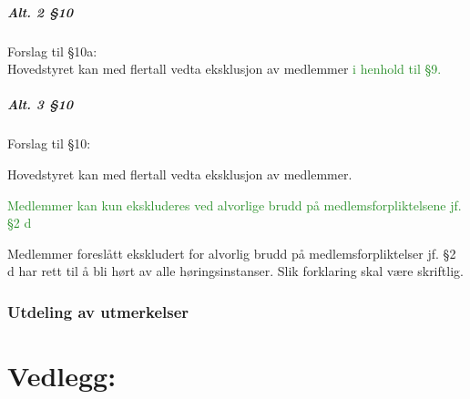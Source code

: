 \documentclass[10pt,norsk,a4paper,usenames,dvipsnames]{article}
\begin{document}
        \subsubsection{Alt. 2 §10} 
            Forslag til §10a:
            \\Hovedstyret kan med  flertall vedta eksklusjon av medlemmer \textcolor{ForestGreen}{i henhold til §9.}
        \label{sec:10-half-full}


        \subsubsection{Alt. 3 §10} 
            Forslag til §10:
            \begin{enumerate}
            	\item Hovedstyret kan med  flertall vedta eksklusjon av medlemmer.
            	\textcolor{ForestGreen}{\item Medlemmer kan kun ekskluderes ved alvorlige brudd på medlemsforpliktelsene jf. §2 d}
            	\item Medlemmer foreslått ekskludert for alvorlig brudd på medlemsforpliktelser jf. §2 d har rett til å bli hørt av alle høringsinstanser. Slik forklaring skal være skriftlig.
            \end{enumerate}
        \label{sec:10-full}



\section{Utdeling av utmerkelser}



\part*{Vedlegg:}\label{lastpage}

\newpage
{}

\end{document}
